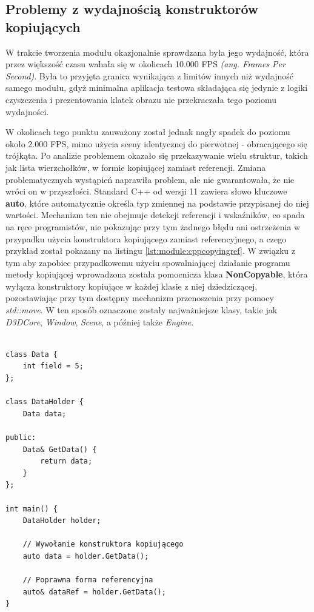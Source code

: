 \subsection{Problemy z wydajnością konstruktorów kopiujących}
W trakcie tworzenia modułu okazjonalnie sprawdzana była jego wydajność, która przez większość czasu wahała się w okolicach 10.000 FPS \textit{(ang. Frames Per Second)}. Była to przyjęta granica wynikająca z limitów innych niż wydajność samego modułu, gdyż minimalna aplikacja testowa składająca się jedynie z logiki czyszczenia i prezentowania klatek obrazu nie przekraczała tego poziomu wydajności. 

W okolicach tego punktu zauważony został jednak nagły spadek do poziomu około 2.000 FPS, mimo użycia sceny identycznej do pierwotnej - obracającego się trójkąta. Po analizie problemem okazało się przekazywanie wielu struktur, takich jak lista wierzchołków, w formie kopiującej zamiast referencji. Zmiana problematycznych wystąpień naprawiła problem, ale nie gwarantowała, że nie wróci on w przyszłości. Standard C++ od wersji 11 zawiera słowo kluczowe \textbf{auto}, które automatycznie określa typ zmiennej na podstawie przypisanej do niej wartości. Mechanizm ten nie obejmuje detekcji referencji i wskaźników, co spada na ręce programistów, nie pokazując przy tym żadnego błędu ani ostrzeżenia w przypadku użycia konstruktora kopiującego zamiast referencyjnego, a czego przykład został pokazany na listingu \ref{lst:module:cppcopyingref}. W związku z tym aby zapobiec przypadkowemu użyciu spowalniającej działanie programu metody kopiującej wprowadzona została pomocnicza klasa \textbf{NonCopyable}, która wyłącza konstruktory kopiujące w każdej klasie z niej dziedziczącej, pozostawiając przy tym dostępny mechanizm przenoszenia przy pomocy \textit{std::move}. W ten sposób oznaczone zostały najważniejsze klasy, takie jak \textit{D3DCore}, \textit{Window}, \textit{Scene}, a później także \textit{Engine}. 

\begin{lstlisting}[caption={Przykład sytuacji, w której łatwym jest użycie formy kopiującej zamiast referencji, co skutkuje dużym kosztem wydajnościowym.}, label={lst:module:cppcopyingref}]
	
class Data {
    int field = 5;
};

class DataHolder {
    Data data;
	
public:
    Data& GetData() {
        return data;
    }
};

int main() {
    DataHolder holder;
	
    // Wywołanie konstruktora kopiującego
    auto data = holder.GetData();
	
    // Poprawna forma referencyjna
    auto& dataRef = holder.GetData();
}
	
\end{lstlisting}

